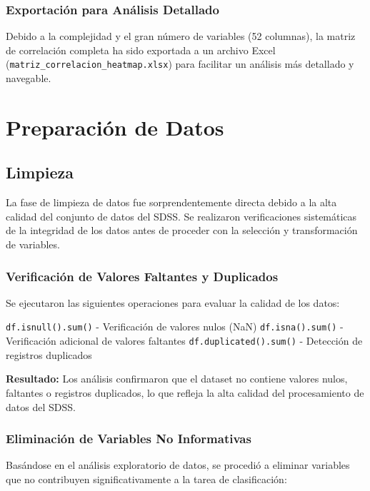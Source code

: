 \documentclass{article}
\begin{document}
\subsubsection{Exportación para Análisis Detallado}

Debido a la complejidad y el gran número de variables (52 columnas), la matriz de correlación completa ha sido exportada a un archivo Excel (\texttt{matriz\_correlacion\_heatmap.xlsx}) para facilitar un análisis más detallado y navegable.


\newpage

\section{Preparación de Datos}

\subsection{Limpieza}

La fase de limpieza de datos fue sorprendentemente directa debido a la alta calidad del conjunto de datos del SDSS. Se realizaron verificaciones sistemáticas de la integridad de los datos antes de proceder con la selección y transformación de variables.

\subsubsection{Verificación de Valores Faltantes y Duplicados}

Se ejecutaron las siguientes operaciones para evaluar la calidad de los datos:

\texttt{df.isnull().sum()} - Verificación de valores nulos (NaN)
\texttt{df.isna().sum()} - Verificación adicional de valores faltantes
\texttt{df.duplicated().sum()} - Detección de registros duplicados

\textbf{Resultado:} Los análisis confirmaron que el dataset no contiene valores nulos, faltantes o registros duplicados, lo que refleja la alta calidad del procesamiento de datos del SDSS.

\subsubsection{Eliminación de Variables No Informativas}

Basándose en el análisis exploratorio de datos, se procedió a eliminar variables que no contribuyen significativamente a la tarea de clasificación:
\end{document}
